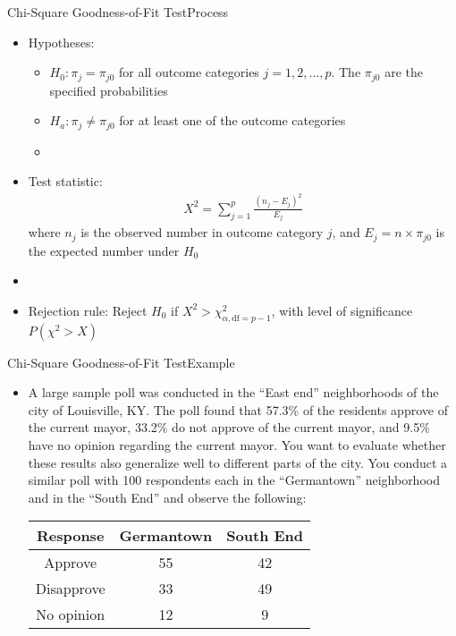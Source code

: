 \documentclass[xcolor=dvipsnames]{beamer}
\begin{document}
\begin{frame}{Chi-Square Goodness-of-Fit Test}{Process}
	\begin{itemize}
		\item Hypotheses:
		\begin{itemize}
			\item $H_0: \pi_j = \pi_{j0}$ for all outcome categories $j = 1, 2, \hdots, p$. The $\pi_{j0}$ are the specified probabilities
			\item $H_a: \pi_j \neq \pi_{j0}$ for at least one of the outcome categories
			\item[]
		\end{itemize}
	\item Test statistic: 
	\begin{gather*}
		X^2 = \sum_{j=1}^p \frac{(n_j-E_j)^2}{E_j}
	\end{gather*}
	where $n_j$ is the observed number in outcome category $j$, and $E_j=n \times \pi_{j0}$ is the expected number under $H_0$
	\item[]
	\item Rejection rule: Reject $H_0$ if $X^2 > \chi_{\alpha,\text{df}=p-1}^2$, with level of significance $P(\chi^2 > X)$
	\end{itemize}
\end{frame}

\begin{frame}{Chi-Square Goodness-of-Fit Test}{Example}
	\begin{itemize}
		\item A large sample poll was conducted in the ``East end'' neighborhoods of the city of Louisville, KY. The poll found that 57.3\% of the residents approve of the current mayor, 33.2\% do not approve of the current mayor, and 9.5\% have no opinion regarding the current mayor. You want to evaluate whether these results also generalize well to different parts of the city. You conduct a similar poll with 100 respondents each in the ``Germantown'' neighborhood and in the ``South End'' and observe the following:
		\vspace{2mm}
		\begin{center}
			\begin{tabular}{ccc}
				\hline
				Response & Germantown & South End \\ \hline \hline
				Approve & 55 & 42\\
				Disapprove & 33 & 49 \\
				No opinion & 12 & 9 \\ \hline
			\end{tabular}
		\end{center}
	\end{itemize}
\end{frame}
\end{document}
